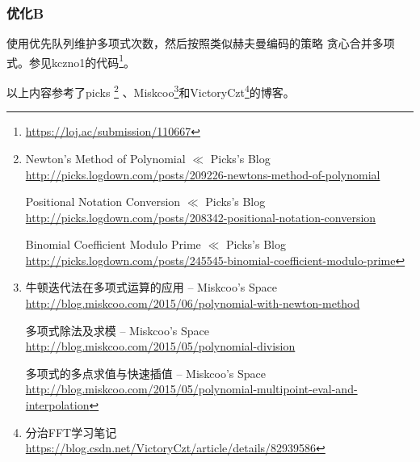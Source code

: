 \subsubsection{优化B} 使用优先队列维护多项式次数，然后按照类似赫夫曼编码的策略
贪心合并多项式。参见kczno1的代码\footnote{\url{https://loj.ac/submission/110667}}。

以上内容参考了picks
\footnote{
Newton's Method of Polynomial $\ll$ Picks's Blog
\\\url{http://picks.logdown.com/posts/209226-newtons-method-of-polynomial}

Positional Notation Conversion $\ll$ Picks's Blog
\\\url{http://picks.logdown.com/posts/208342-positional-notation-conversion}

Binomial Coefficient Modulo Prime $\ll$ Picks's Blog
\\\url{http://picks.logdown.com/posts/245545-binomial-coefficient-modulo-prime}

}
、Miskcoo\footnote{
牛顿迭代法在多项式运算的应用 – Miskcoo's Space
\\\url{http://blog.miskcoo.com/2015/06/polynomial-with-newton-method}

多项式除法及求模 – Miskcoo's Space
\\\url{http://blog.miskcoo.com/2015/05/polynomial-division}

多项式的多点求值与快速插值 – Miskcoo's Space
\\\url{http://blog.miskcoo.com/2015/05/polynomial-multipoint-eval-and-interpolation}
}和VictoryCzt\footnote{
    分治FFT学习笔记
    \url{https://blog.csdn.net/VictoryCzt/article/details/82939586}
}的博客。
